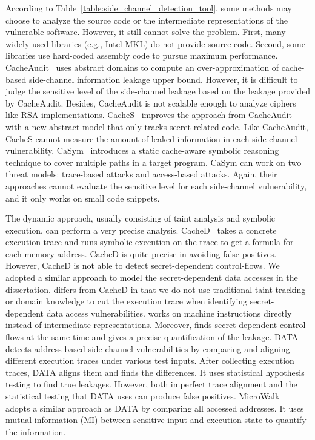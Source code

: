 According to Table~\ref{table:side_channel_detection_tool}, some methods may choose to analyze the source code or the intermediate representations of the vulnerable software. However, it still cannot solve the problem. First, many widely-used libraries (e.g., Intel MKL) do not provide source code. Second, some libraries use hard-coded assembly code to pursue maximum performance.
CacheAudit~\cite{182946} uses abstract domains to compute an
over-approximation of cache-based side-channel information leakage upper bound.
However, it is difficult to judge the sensitive level of the side-channel leakage based on the leakage provided by CacheAudit. Besides, CacheAudit is not scalable enough to analyze ciphers like RSA implementations. CacheS~\cite{236338} improves the approach from
CacheAudit with a new abstract model that only tracks
secret-related code. Like CacheAudit, CacheS cannot
measure the amount of leaked information in each side-channel vulnerability.
CaSym~\cite{Brotzman19Casym} introduces a static cache-aware symbolic reasoning technique to cover multiple paths in a target program. CaSym can work on two threat models: trace-based attacks and access-based attacks. Again, their
approaches cannot evaluate the sensitive level for each side-channel vulnerability, and it only works on small code snippets.

The dynamic approach, usually consisting of taint analysis and symbolic execution,
can perform a very precise analysis. CacheD~\cite{203878} takes a concrete execution trace and runs symbolic execution on the trace
to get a formula for each memory address. CacheD is
quite precise in avoiding false positives. However, CacheD is not able to detect secret-dependent control-flows. We adopted a similar approach to model the secret-dependent data accesses in the dissertation. \tool{} differs from CacheD in that we do not use traditional taint tracking or domain knowledge to cut the execution trace when identifying secret-dependent data access vulnerabilities. \tool{} works on machine instructions directly instead of intermediate representations. Moreover, \tool{} finds secret-dependent control-flows at the same time and gives a precise quantification of the leakage. DATA~\cite{217537} detects address-based side-channel vulnerabilities by comparing and aligning different execution traces under various test inputs. After collecting execution traces, DATA aligns them and finds the differences. It uses statistical hypothesis testing to find true leakages. However, both imperfect trace alignment and the statistical testing that DATA uses can produce false positives.
MicroWalk~\cite{Wichelmann:2018:MFF:3274694.3274741} adopts a similar approach as DATA by comparing all accessed addresses. It uses mutual information (MI) between sensitive input and execution state to quantify the information. 

